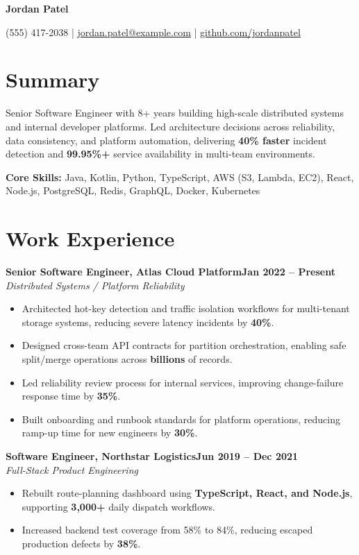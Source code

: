 \documentclass[10pt]{article}
\newcommand{\resumeTitle}[1]{\centerline{\Large \bfseries #1}\vspace{0pt}}
\newcommand{\resumeContact}[1]{\centerline{\small #1}\vspace{2pt}}
\newcommand{\role}[3]{%
  \textbf{#1}\hfill \textbf{#2}\\
  \textit{#3}\vspace{0pt}
}
\newcommand{\skills}[1]{\textbf{Core Skills:} #1}
\begin{document}
\pagestyle{empty}

\resumeTitle{Jordan Patel}
\resumeContact{
(555) 417-2038 \;|\;
\href{mailto:jordan.patel@example.com}{jordan.patel@example.com} \;|\;
\href{https://github.com/jordanpatel}{github.com/jordanpatel}
}

\section*{Summary}
Senior Software Engineer with 8+ years building high-scale distributed systems and internal developer platforms. Led architecture decisions across reliability, data consistency, and platform automation, delivering \textbf{40\% faster} incident detection and \textbf{99.95\%+} service availability in multi-team environments.

\vspace{1pt}
\skills{Java, Kotlin, Python, TypeScript, AWS (S3, Lambda, EC2), React, Node.js, PostgreSQL, Redis, GraphQL, Docker, Kubernetes}

\section*{Work Experience}

\role{Senior Software Engineer, Atlas Cloud Platform}{Jan 2022 -- Present}{Distributed Systems / Platform Reliability}
\begin{itemize}
  \item Architected hot-key detection and traffic isolation workflows for multi-tenant storage systems, reducing severe latency incidents by \textbf{40\%}.
  \item Designed cross-team API contracts for partition orchestration, enabling safe split/merge operations across \textbf{billions} of records.
  \item Led reliability review process for internal services, improving change-failure response time by \textbf{35\%}.
  \item Built onboarding and runbook standards for platform operations, reducing ramp-up time for new engineers by \textbf{30\%}.
\end{itemize}

\role{Software Engineer, Northstar Logistics}{Jun 2019 -- Dec 2021}{Full-Stack Product Engineering}
\begin{itemize}
  \item Rebuilt route-planning dashboard using \textbf{TypeScript, React, and Node.js}, supporting \textbf{3,000+} daily dispatch workflows.
  \item Increased backend test coverage from 58\% to 84\%, reducing escaped production defects by \textbf{38\%}.
\end{itemize}
\end{document}
